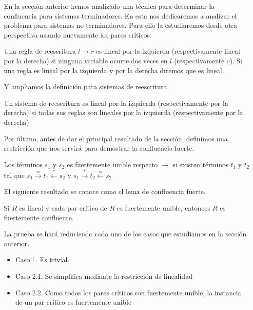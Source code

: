 En la sección anterior hemos analizado una técnica para determinar la
confluencia para sistemas terminadores. En esta nos dedicaremos a
analizar el problema para sistemas no terminadores. Para ello la
estudiaremos desde otra perspectiva usando nuevamente los pares
críticos.

\begin{defi}
  Una regla de reescritura $l \rightarrow r$ es lineal por la
  izquierda (respectivamente lineal por la derecha) si ninguna
  variable ocurre dos veces en $l$ (respectivamente $r$). Si una regla
  es lineal por la izquierda y por la derecha diremos que es lineal. 
\end{defi}

Y ampliamos la definición para sistemas de reescritura.

\begin{defi}
  Un sistema de reescritura es lineal por la izquierda
  (respectivamente por la derecha) si todas sus reglas son lineales por
  la izquierda (respectivamente por la derecha)
\end{defi}

Por último, antes de dar el principal resultado de la sección,
definimos una restricción que nos servirá para demostrar la
confluencia fuerte.

\begin{defi}
  Los términos $s_1$ y $s_2$ es fuertemente unible respecto
  $\rightarrow$ si existen términos $t_1$ y $t_2$ tal que
  $s_1 \xrightarrow{=} t_1 \xleftarrow{*} s_2$ y $s_1 \xrightarrow{*}
  t_2 \xleftarrow{=} s_2$
\end{defi}


El siguiente resultado se conoce como el lema de confluencia fuerte.

\begin{defi}
  Si $R$ es lineal y cada par crítico de $R$ es fuertemente unible,
  entonces $R$ es fuertemente confluente.
\end{defi}

\begin{demo}
  La prueba se hará reduciendo cada uno de los casos que estudiamos en
  la sección anterior.
  
  \begin{itemize}
    
  \item Caso 1. Es trivial.

  \item Caso 2.1. Se simplifica mediante la restricción de linealidad

  \item Caso 2.2. Como todos los pares críticos son fuertemente
    unible, la instancia de un par crítico es fuertemente unible

  \end{itemize}

\end{demo}

